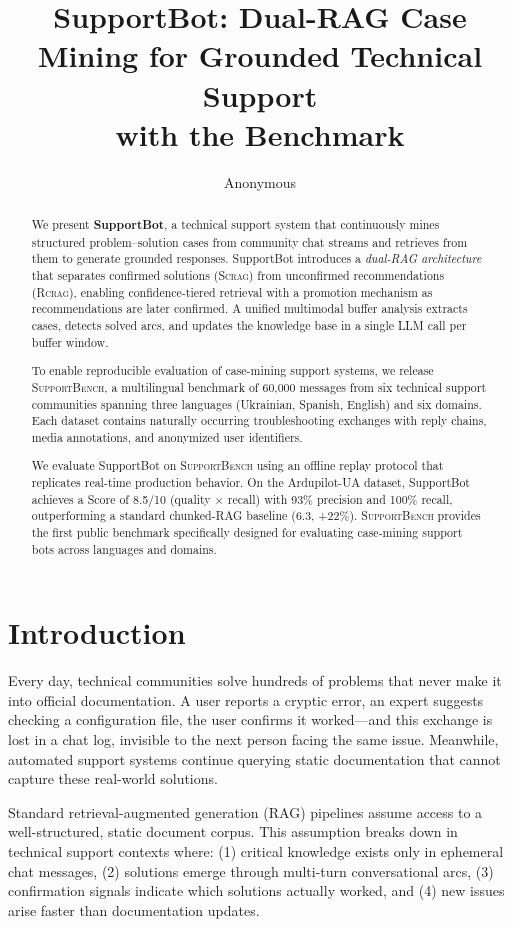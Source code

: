 \documentclass[11pt]{article}
\title{SupportBot: Dual-RAG Case Mining for Grounded Technical Support \\ with the \supportbench{} Benchmark}
\author{Anonymous}
\newcommand{\scrag}{\textsc{Scrag}}
\newcommand{\rcrag}{\textsc{Rcrag}}
\newcommand{\supportbench}{\textsc{SupportBench}}
\begin{document}
\maketitle

\begin{abstract}
We present \textbf{SupportBot}, a technical support system that continuously mines structured problem--solution cases from community chat streams and retrieves from them to generate grounded responses. SupportBot introduces a \emph{dual-RAG architecture} that separates confirmed solutions (\scrag{}) from unconfirmed recommendations (\rcrag{}), enabling confidence-tiered retrieval with a promotion mechanism as recommendations are later confirmed. A unified multimodal buffer analysis extracts cases, detects solved arcs, and updates the knowledge base in a single LLM call per buffer window.

To enable reproducible evaluation of case-mining support systems, we release \supportbench{}, a multilingual benchmark of 60{,}000 messages from six technical support communities spanning three languages (Ukrainian, Spanish, English) and six domains. Each dataset contains naturally occurring troubleshooting exchanges with reply chains, media annotations, and anonymized user identifiers.

We evaluate SupportBot on \supportbench{} using an offline replay protocol that replicates real-time production behavior. On the Ardupilot-UA dataset, SupportBot achieves a Score of 8.5/10 (quality $\times$ recall) with 93\% precision and 100\% recall, outperforming a standard chunked-RAG baseline (6.3, +22\%). \supportbench{} provides the first public benchmark specifically designed for evaluating case-mining support bots across languages and domains.
\end{abstract}

\section{Introduction}

Every day, technical communities solve hundreds of problems that never make it into official documentation. A user reports a cryptic error, an expert suggests checking a configuration file, the user confirms it worked---and this exchange is lost in a chat log, invisible to the next person facing the same issue. Meanwhile, automated support systems continue querying static documentation that cannot capture these real-world solutions.

Standard retrieval-augmented generation (RAG) pipelines \citep{lewis2020rag,guu2020realm,borgeaud2022retro} assume access to a well-structured, static document corpus. This assumption breaks down in technical support contexts where: (1) critical knowledge exists only in ephemeral chat messages, (2) solutions emerge through multi-turn conversational arcs, (3) confirmation signals indicate which solutions actually worked, and (4) new issues arise faster than documentation updates.
\end{document}
